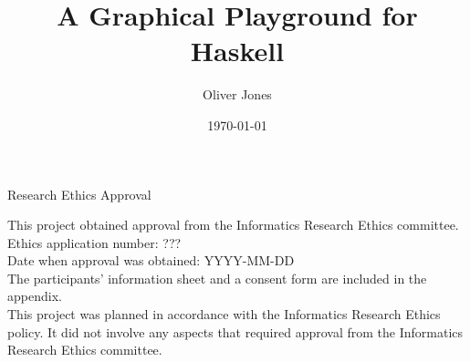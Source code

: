\documentclass[../main.tex]{subfiles}
\begin{document}
\begin{preliminary}

    \title{A Graphical Playground for Haskell}
    \author{Oliver Jones}
    \date{\today}

    \abstract{
    }

    \maketitle

    \newenvironment{ethics}{
        \begin{frontenv}{Research Ethics Approval}{\LARGE}} {
        \end{frontenv}
        \newpage}

    \begin{ethics}

        This project obtained approval from the Informatics Research Ethics committee.
        \\
        Ethics application number: ???
        \\
        Date when approval was obtained: YYYY-MM-DD
        \\

        The participants' information sheet and a consent form are included in the
            appendix.
        \\

        This project was planned in accordance with the Informatics Research Ethics
            policy.
        It did not involve any aspects that required approval from the Informatics
            Research Ethics committee.

        \standarddeclaration
    \end{ethics}

    \begin{acknowledgements}
    \end{acknowledgements}

    \tableofcontents
\end{preliminary}
\end{document}
